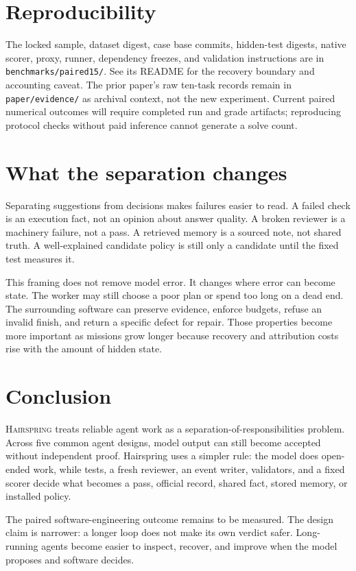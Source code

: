 \documentclass[10pt,letterpaper]{article}
\newcommand{\system}{\textsc{Hairspring}}
\newcommand{\code}[1]{\texttt{\small #1}}
\begin{document}
\section{Reproducibility}
The locked sample, dataset digest, case base commits, hidden-test digests, native scorer, proxy, runner, dependency freezes, and validation instructions are in \code{benchmarks/paired15/}. See its README for the recovery boundary and accounting caveat. The prior paper's raw ten-task records remain in \code{paper/evidence/} as archival context, not the new experiment. Current paired numerical outcomes will require completed run and grade artifacts; reproducing protocol checks without paid inference cannot generate a solve count.

\section{What the separation changes}
Separating suggestions from decisions makes failures easier to read. A failed check is an execution fact, not an opinion about answer quality. A broken reviewer is a machinery failure, not a pass. A retrieved memory is a sourced note, not shared truth. A well-explained candidate policy is still only a candidate until the fixed test measures it.

This framing does not remove model error. It changes where error can become state. The worker may still choose a poor plan or spend too long on a dead end. The surrounding software can preserve evidence, enforce budgets, refuse an invalid finish, and return a specific defect for repair. Those properties become more important as missions grow longer because recovery and attribution costs rise with the amount of hidden state.

\section{Conclusion}
\system{} treats reliable agent work as a separation-of-responsibilities problem. Across five common agent designs, model output can still become accepted without independent proof. Hairspring uses a simpler rule: the model does open-ended work, while tests, a fresh reviewer, an event writer, validators, and a fixed scorer decide what becomes a pass, official record, shared fact, stored memory, or installed policy.

The paired software-engineering outcome remains to be measured. The design claim is narrower: a longer loop does not make its own verdict safer. Long-running agents become easier to inspect, recover, and improve when the model proposes and software decides.
\end{document}
